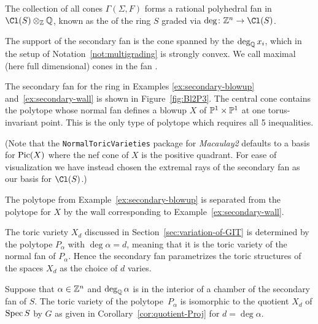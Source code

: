 \documentclass{article}
\begin{document}
\begin{prop}\label{prop:fan-structure}
  The collection of all cones $\Gamma(\Sigma,F)$ forms a rational polyhedral fan in $\Cl(S)\otimes_\ZZ\QQ$, known as the  of the ring $S$ graded via $\deg\colon\ZZ^n\to\Cl(S)$.

  The support of the secondary fan is the cone spanned by the $\deg_\mathbb Q x_i$, which in the setup of Notation~\ref{not:multigrading} is strongly convex.  We call maximal (here full dimensional) cones in the fan .
\end{prop}

\begin{example}\label{ex:secondary-blowup-2}
  The secondary fan for the ring in Examples \ref{ex:secondary-blowup} and~\ref{ex:secondary-wall} is shown in Figure~\ref{fig:Bl2P3}.  The central cone contains the polytope whose normal fan defines a blowup $X$ of $\mathbb P^1\times\mathbb P^1$ at one torus-invariant point.  This is the only type of polytope which requires all 5 inequalities.

  

  (Note that the \texttt{NormalToricVarieties} package for \emph{Macaulay2} defaults to a basis for $\operatorname{Pic}(X)$ where the nef cone of $X$ is the positive quadrant.  For ease of visualization we have instead chosen the extremal rays of the secondary fan as our basis for $\Cl(S)$.)

  The polytope from Example~\ref{ex:secondary-blowup} is separated from the polytope for $X$ by the wall corresponding to Example~\ref{ex:secondary-wall}.
\end{example}

The toric variety $X_d$ discussed in Section~\ref{sec:variation-of-GIT} is determined by the polytope $P_\alpha$ with $\deg\alpha=d$, meaning that it is the toric variety of the normal fan of $P_\alpha$.  Hence the secondary fan parametrizes the toric structures of the spaces $X_d$ as the choice of $d$ varies.

\begin{thm}\label{thm:GIT-polytope}
  Suppose that $\alpha\in\mathbb Z^n$ and $\deg_\mathbb Q\alpha$ is in the interior of a chamber of the secondary fan of $S$.  The toric variety of the polytope~$P_\alpha$ is isomorphic to the quotient $X_d$ of $\operatorname{Spec} S$ by $G$ as given in Corollary~\ref{cor:quotient-Proj} for $d=\deg\alpha$.
\end{thm}
\end{document}
